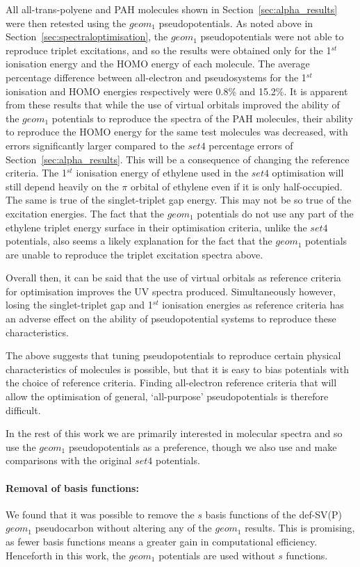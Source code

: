 \documentclass[aip,reprint,nofootinbib]{revtex4-1}
\begin{document}
All all-trans-polyene and PAH molecules shown in Section~\ref{sec:alpha_results} were then retested using the $geom_1$ pseudopotentials. As noted above in Section~\ref{sec:spectraloptimisation}, the $geom_1$ pseudopotentials were not able to reproduce triplet excitations, and so the results were obtained only for the 1$^{st}$ ionisation energy and the HOMO energy of each molecule. The average percentage difference between all-electron and pseudosystems for the 1$^{st}$ ionisation and HOMO energies respectively were 0.8\% and 15.2\%. It is apparent from these results that while the use of virtual orbitals improved the ability of the $geom_1$ potentials to reproduce the spectra of the PAH molecules, their ability to reproduce the HOMO energy for the same test molecules was decreased, with errors significantly larger compared to the $set4$ percentage errors of Section~\ref{sec:alpha_results}. This will be a consequence of changing the reference criteria. The 1$^{st}$ ionisation energy of ethylene used in the $set4$ optimisation will still depend heavily on the $\pi$ orbital of ethylene even if it is only half-occupied. The same is true of the singlet-triplet gap energy. This may not be so true of the excitation energies. The fact that the $geom_1$ potentials do not use any part of the ethylene triplet energy surface in their optimisation criteria, unlike the $set4$ potentials, also seems a likely explanation for the fact that the $geom_1$ potentials are unable to reproduce the triplet excitation spectra above.

Overall then, it can be said that the use of virtual orbitals as reference criteria for optimisation improves the UV spectra produced. Simultaneously however, losing the singlet-triplet gap and 1$^{st}$ ionisation energies as reference criteria has an adverse effect on the ability of pseudopotential systems to reproduce these characteristics. 

The above suggests that tuning pseudopotentials to reproduce certain physical characteristics of molecules is possible, but that it is easy to bias potentials with the choice of reference criteria. Finding all-electron reference criteria that will allow the optimisation of general, `all-purpose' pseudopotentials is therefore difficult. 

In the rest of this work we are primarily interested in molecular spectra and so use the $geom_1$ pseudopotentials as a preference, though we also use and make comparisons with the original $set4$ potentials.

\paragraph{Removal of basis functions:} We found that it was possible to remove the $s$ basis functions of the def-SV(P) $geom_1$ pseudocarbon without altering any of the $geom_1$ results. This is promising, as fewer basis functions means a greater gain in computational efficiency. Henceforth in this work, the $geom_1$ potentials are used without $s$ functions.
\end{document}

